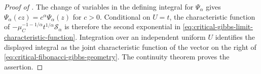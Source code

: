 \begin{proof}[Proof of ]
The change of variables in the defining integral for \(\Psi_\alpha\) gives
\(\Psi_\alpha(cz)=c^\alpha\Psi_\alpha(z)\) for \(c>0\).  Conditional on
\(U=t\), the characteristic function of
\(-\mu_C^{-1-1/\alpha}t^{1/\alpha}\mathcal S_\alpha\) is therefore the
second exponential in
\eqref{eq:critical-gibbs-limit-characteristic-function}.  Integration over
an independent uniform \(U\) identifies the displayed integral as the joint
characteristic function of the vector on the right of
\eqref{eq:critical-fibonacci-gibbs-geometry}.  The continuity theorem proves
the assertion.
\end{proof}
